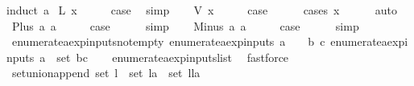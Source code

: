 \begin{isabellebody}
%
\isadelimproof
%
\endisadelimproof
%
\isatagproof
{}\isamarkupfalse%
{\isacharparenleft}induct\ a{\isacharparenright}\isanewline
{}\isamarkupfalse%
\ {\isacharparenleft}L\ x{\isacharparenright}\isanewline
\ \ \isamarkupfalse%
\ \isamarkupfalse%
\ {\isacharquery}case\ \isamarkupfalse%
\ simp\isanewline
{}\isamarkupfalse%
\isanewline
\ \ \isamarkupfalse%
\ {\isacharparenleft}V\ x{\isacharparenright}\isanewline
\ \ \isamarkupfalse%
\ \isamarkupfalse%
\ {\isacharquery}case\isanewline
\ \ \ \ \isamarkupfalse%
\ {\isacharparenleft}cases\ x{\isacharparenright}\isanewline
\ \ \ \ \isamarkupfalse%
\ auto\isanewline
{}\isamarkupfalse%
\isanewline
\ \ \isamarkupfalse%
\ {\isacharparenleft}Plus\ a{}\ a{}{\isacharparenright}\isanewline
\ \ \isamarkupfalse%
\ \isamarkupfalse%
\ {\isacharquery}case\isanewline
\ \ \ \ \isamarkupfalse%
\ simp\isanewline
{}\isamarkupfalse%
\isanewline
\ \ \isamarkupfalse%
\ {\isacharparenleft}Minus\ a{}\ a{}{\isacharparenright}\isanewline
\ \ \isamarkupfalse%
\ \isamarkupfalse%
\ {\isacharquery}case\isanewline
\ \ \ \ \isamarkupfalse%
\ simp\isanewline
{}\isamarkupfalse%
%
\endisatagproof
{\isafoldproof}%
%
\isadelimproof
\isanewline
%
\endisadelimproof
\isanewline
{}\isamarkupfalse%
\ enumerate{\isacharunderscore}aexp{\isacharunderscore}inputs{\isacharunderscore}not{\isacharunderscore}empty{\isacharcolon}\ {\isachardoublequoteopen}{\isacharparenleft}enumerate{\isacharunderscore}aexp{\isacharunderscore}inputs\ a\ {\isasymnoteq}\ {\isacharbraceleft}{\isacharbraceright}{\isacharparenright}\ {\isacharequal}\ {\isacharparenleft}{\isasymexists}b\ c{\isachardot}\ enumerate{\isacharunderscore}aexp{\isacharunderscore}inputs\ a\ {\isacharequal}\ set\ {\isacharparenleft}b{\isacharhash}c{\isacharparenright}{\isacharparenright}{\isachardoublequoteclose}\isanewline
%
\isadelimproof
\ \ %
\endisadelimproof
%
\isatagproof
{}\isamarkupfalse%
\ enumerate{\isacharunderscore}aexp{\isacharunderscore}inputs{\isacharunderscore}list\ \isamarkupfalse%
\ fastforce%
\endisatagproof
{\isafoldproof}%
%
\isadelimproof
\isanewline
%
\endisadelimproof
\isanewline
{}\isamarkupfalse%
\ set{\isacharunderscore}union{\isacharunderscore}append{\isacharcolon}\ {\isachardoublequoteopen}set\ l\ {\isasymunion}\ set\ la\ {\isacharequal}\ set\ {\isacharparenleft}l{\isacharat}la{\isacharparenright}{\isachardoublequoteclose}\isanewline

\end{isabellebody}
